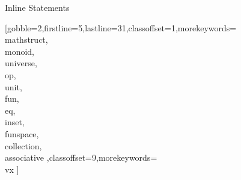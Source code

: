\documentclass[lang={en,de}]{stex}
\begin{document}
  \begin{sfragment}{Inline Statements}


    [gobble=2,firstline=5,lastline=31,classoffset=1,morekeywords={
    \\mathstruct,\\monoid,\\universe,\\op,\\unit,\\fun,\\eq,\\inset,
    \\funspace,\\collection,\\associative
    },classoffset=9,morekeywords={
      \\vx
    }]
    
  \end{sfragment}
\end{document}
